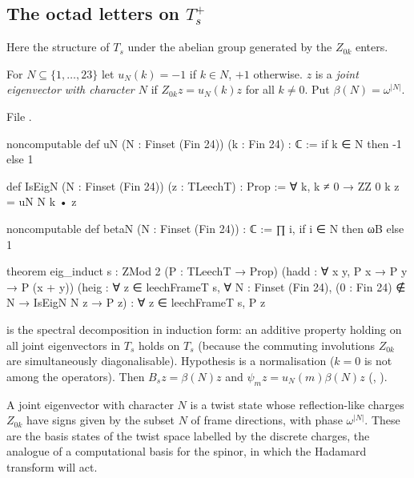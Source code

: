 \subsection{\texorpdfstring{The octad letters on $T_s^+$}{The octad letters on Ts+}}\label{ch13:ssec:octTT}
Here the structure of $T_s$ under the abelian group generated by the $Z_{0k}$ enters.
\begin{definition}\label{ch13:def:eigN}
For $N\subseteq\{1,\dots,23\}$ let $u_N(k)=-1$ if $k\in N$, $+1$ otherwise. $z$ is a \emph{joint eigenvector with
character $N$} if $Z_{0k}z=u_N(k)z$ for all $k\ne0$. Put $\beta(N)=\omega^{|N|}$.
\end{definition}
\noindent File .
\begin{leancode}
noncomputable def uN (N : Finset (Fin 24)) (k : Fin 24) : ℂ := if k ∈ N then -1 else 1

def IsEigN (N : Finset (Fin 24)) (z : TLeechT) : Prop := ∀ k, k ≠ 0 → ZZ 0 k z = uN N k • z

noncomputable def betaN (N : Finset (Fin 24)) : ℂ := ∏ i, if i ∈ N then ωB else 1

theorem eig_induct {s : ZMod 2} (P : TLeechT → Prop) (hadd : ∀ x y, P x → P y → P (x + y))
    (heig : ∀ z ∈ leechFrameT s, ∀ N : Finset (Fin 24), (0 : Fin 24) ∉ N → IsEigN N z → P z) :
    ∀ z ∈ leechFrameT s, P z
\end{leancode}
\begin{dictionary}
 is the spectral decomposition in induction form: an additive property holding on all
joint eigenvectors in $T_s$ holds on $T_s$ (because the commuting involutions $Z_{0k}$ are simultaneously
diagonalisable). Hypothesis  is a normalisation ($k=0$ is not among the
operators). Then $B_sz=\beta(N)z$ and $\psi_mz=u_N(m)\beta(N)z$ (, ).
\end{dictionary}
\begin{physics}
A joint eigenvector with character $N$ is a twist state whose reflection-like charges $Z_{0k}$ have signs given by the subset $N$ of frame directions, with phase $\omega^{|N|}$. These are the basis states of the twist space labelled by the discrete charges, the analogue of a computational basis for the spinor, in which the Hadamard transform will act.
\end{physics}

